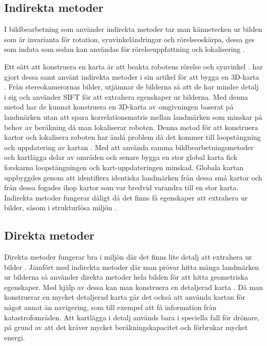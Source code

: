 \subsection{Indirekta metoder}

I bildbearbetning som använder indirekta metoder tar man kännetecken ur bilden som är invarianta för rotation, synvinkeländringar och rörelseoskärpa, dessa ges som indata som sedan kan användas för rörelseuppfattning och lokalisering \citep{geospatial}. 

Ett sätt att konstruera en karta är att beakta robotens rörelse och synvinkel \citep{globalsubmaps}. \cite{mapbuildingsift} har gjort dessa samt använt indirekta metoder i sin artikel  för att bygga en 3D-karta \citep{mapbuildingsift}. Från stereokamerornas bilder, utjämnar de bilderna så att de har mindre detalj i sig och använder SIFT för att extrahera egenskaper ur bilderna. Med denna metod har de kunnat konstruera en 3D-karta av omgivningen baserat på landmärken utan att spara korrelationsmatris mellan landmärken som minskar på behov av beräkning då man lokaliserar roboten. Denna metod för att konstruera kartor och lokalisera roboten har ändå problem då det kommer till loopstängning och uppdatering av kartan \citep{globalsubmaps}. Med att använda samma bildbearbetningsmetoder och kartlägga delar av områden och senare bygga en stor global karta fick forskarna loopstängningen och kart-uppdateringen minskad. Globala kartan uppbyggdes genom att identifiera identiska landmärken från dessa små kartor och från dessa fogades ihop kartor som var bredvid varandra till en stor karta. Indirekta metoder fungerar dåligt då det finns få egenskaper att extrahera ur bilder, såsom i strukturlösa miljön \citep{geospatial}.

\subsection{Direkta metoder}

Direkta metoder fungerar bra i miljön där det finns lite detalj att extrahera ur bilder \citep{Engel2014LSDSLAMLD}. Jämfört med indirekta metoder där man prövar hitta många landmärken ur bilderna så använder direkta metoder hela bilden för att hitta geometriska egenskaper. Med hjälp av dessa kan man konstruera en detaljerad karta \citep{geospatial}. Då man konstruerar en mycket detaljerad karta går det också att använda kartan för något annat än navigering, som till exempel att få information från katastrofområden. Att kartlägga i detalj används bara i speciella fall för drönare, på grund av att det kräver mycket beräkningskapacitet och förbrukar mycket energi.

